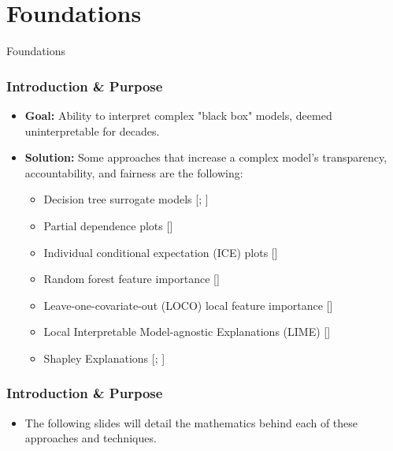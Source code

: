 \section{Foundations}

\begin{frame}[c]
\Huge{\centerline{Foundations}}
\end{frame}


\begin{frame}\frametitle{Introduction \& Purpose}
	\begin{itemize}
		\item \textbf{Goal:} Ability to interpret complex "black box" models, deemed uninterpretable for decades.
		\bigskip 
		\item \textbf{Solution:} Some approaches that increase a complex model's transparency, accountability, and fairness are the following:
		\bigskip
		\begin{itemize}
			\item Decision tree surrogate models [\cite{dt_surrogate1}; \cite{dt_surrogate2}]
			\item Partial dependence plots [\cite{esl}]
			\item Individual conditional expectation (ICE) plots [\cite{ice_plots}]
			\item Random forest feature importance [\cite{esl}]
			\item Leave-one-covariate-out (LOCO) local feature importance [\cite{conformal_reg}]
			\item Local Interpretable Model-agnostic Explanations (LIME) [\cite{lime}]
			\item Shapley Explanations [\cite{shapley}; \cite{tree_shap}]
			\end{itemize}
	\end{itemize}
\end{frame}

\begin{frame}\frametitle{Introduction \& Purpose}
	\begin{itemize}
		\item The following slides will detail the mathematics behind each of these approaches and techniques. 
	\end{itemize}
\end{frame}


